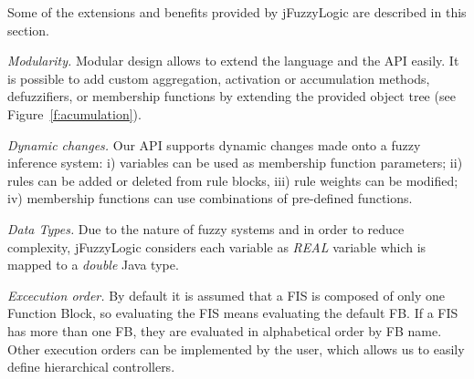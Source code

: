 \documentclass[11pt,twoside]{article}
\begin{document}
\begin{multicols}{2}
Some of the extensions and benefits provided by jFuzzyLogic are described in this section.

\textit{Modularity.} Modular design allows to extend the language and the API easily. It is possible to add custom aggregation, activation or accumulation methods, defuzzifiers, or membership functions by extending the provided object tree (see Figure~\ref{f:acumulation}). 


\textit{Dynamic changes.} Our API supports dynamic changes made onto a fuzzy inference system: i) variables can be used as membership function parameters; ii) rules can be added or deleted from rule blocks, iii) rule weights can be modified; iv) membership functions can use combinations of pre-defined functions. 

\textit{Data Types.} Due to the nature of fuzzy systems and in order to reduce complexity, jFuzzyLogic considers each variable as \textit{REAL} variable which is mapped to a \textit{double} Java type.

\textit{Excecution order.} By default it is assumed that a FIS is composed of only one Function Block, so evaluating the FIS means evaluating the default FB. 
If a FIS has more than one FB, they are evaluated in alphabetical order by FB name. 
Other execution orders can be implemented by the user, which allows us to easily define hierarchical controllers.


\end{multicols}
\end{document}
